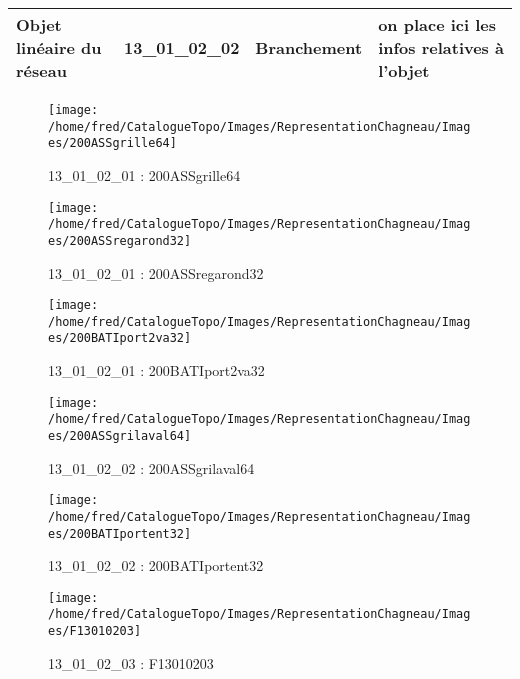 \documentclass[12pt,titlepage,oneside]{book}
\begin{document}
\renewcommand{\arraystretch}{1.2}
\begin{supertabular}{|p{10cm}|c|p{13cm}|p{12cm}|}
 Objet linéaire du réseau & 13\_01\_02\_02 & Branchement & on place ici les infos relatives à l'objet\\
\hline
\end{supertabular}
\begin{figure}[h!]
  \hfill         %
  \begin{minipage}[t]{3cm}
    \begin{center}
      \texttt{[image: /home/fred/CatalogueTopo/Images/RepresentationChagneau/Images/200ASSgrille64]}
      \caption[200ASSgrille64]{\label{} 13\_01\_02\_01 : 200ASSgrille64}
    \end{center}
  \end{minipage}
  \begin{minipage}[t]{3cm}
    \begin{center}
      \texttt{[image: /home/fred/CatalogueTopo/Images/RepresentationChagneau/Images/200ASSregarond32]}
      \caption[200ASSregarond32]{\label{} 13\_01\_02\_01 : 200ASSregarond32}
    \end{center}
  \end{minipage}
  \begin{minipage}[t]{3cm}
    \begin{center}
      \texttt{[image: /home/fred/CatalogueTopo/Images/RepresentationChagneau/Images/200BATIport2va32]}
      \caption[200BATIport2va32]{\label{} 13\_01\_02\_01 : 200BATIport2va32}
    \end{center}
  \end{minipage}
  \begin{minipage}[t]{3cm}
    \begin{center}
      \texttt{[image: /home/fred/CatalogueTopo/Images/RepresentationChagneau/Images/200ASSgrilaval64]}
      \caption[200ASSgrilaval64]{\label{} 13\_01\_02\_02 : 200ASSgrilaval64}
    \end{center}
  \end{minipage}
  \begin{minipage}[t]{3cm}
    \begin{center}
      \texttt{[image: /home/fred/CatalogueTopo/Images/RepresentationChagneau/Images/200BATIportent32]}
      \caption[200BATIportent32]{\label{} 13\_01\_02\_02 : 200BATIportent32}
    \end{center}
  \end{minipage}
  \begin{minipage}[t]{3cm}
    \begin{center}
      \texttt{[image: /home/fred/CatalogueTopo/Images/RepresentationChagneau/Images/F13010203]}
      \caption[F13010203]{\label{} 13\_01\_02\_03 : F13010203}
    \end{center}
  \end{minipage}
\end{figure}
\end{document}
